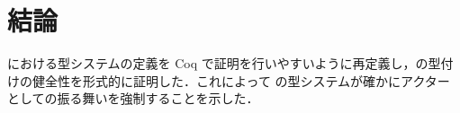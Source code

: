 








\section{結論}

\api における型システムの定義を Coq で証明を行いやすいように再定義し，\api の型付けの健全性を形式的に証明した．これによって \api の型システムが確かにアクターとしての振る舞いを強制することを示した．



